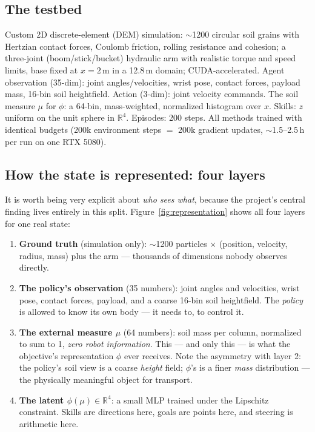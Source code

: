 \documentclass[11pt,a4paper]{article}
\begin{document}
\subsection{The testbed}
Custom 2D discrete-element (DEM) simulation: $\sim$1200 circular soil grains
with Hertzian contact forces, Coulomb friction, rolling resistance and cohesion;
a three-joint (boom/stick/bucket) hydraulic arm with realistic torque and speed
limits, base fixed at $x{=}2$\,m in a 12.8\,m domain; CUDA-accelerated. Agent
observation (35-dim): joint angles/velocities, wrist pose, contact forces,
payload mass, 16-bin soil heightfield. Action (3-dim): joint velocity commands.
The soil measure $\mu$ for $\phi$: a 64-bin, mass-weighted, normalized histogram
over $x$. Skills: $z$ uniform on the unit sphere in $\mathbb{R}^4$. Episodes:
200 steps. All methods trained with identical budgets (200k environment steps
$=$ 200k gradient updates, $\sim$1.5--2.5\,h per run on one RTX 5080).

\subsection{How the state is represented: four layers}

It is worth being very explicit about \emph{who sees what}, because the
project's central finding lives entirely in this split.
Figure~\ref{fig:representation} shows all four layers for one real state:

\begin{enumerate}[leftmargin=6mm]
\item \textbf{Ground truth} (simulation only): $\sim$1200 particles $\times$
(position, velocity, radius, mass) plus the arm --- thousands of dimensions
nobody observes directly.
\item \textbf{The policy's observation} (35 numbers): joint angles and
velocities, wrist pose, contact forces, payload, and a coarse 16-bin soil
heightfield. The \emph{policy} is allowed to know its own body --- it needs to,
to control it.
\item \textbf{The external measure $\mu$} (64 numbers): soil mass per column,
normalized to sum to 1, \emph{zero robot information}. This --- and only this ---
is what the objective's representation $\phi$ ever receives. Note the asymmetry
with layer 2: the policy's soil view is a coarse \emph{height} field; $\phi$'s is
a finer \emph{mass} distribution --- the physically meaningful object for
transport.
\item \textbf{The latent $\phi(\mu) \in \mathbb{R}^4$}: a small MLP trained
under the Lipschitz constraint. Skills are directions here, goals are points
here, and steering is arithmetic here.
\end{enumerate}
\end{document}
